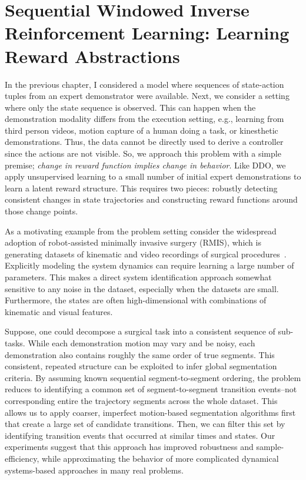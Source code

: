 \chapter{Sequential Windowed Inverse Reinforcement Learning: Learning Reward Abstractions}
In the previous chapter, I considered a model where sequences of state-action tuples from an expert demonstrator were available.
Next, we consider a setting where only the state sequence is observed.
This can happen when the demonstration modality differs from the execution setting, e.g., learning from third person videos, motion capture of a human doing a task, or kinesthetic demonstrations. 
Thus, the data cannot be directly used to derive a controller since the actions are not visible.
So, we approach this problem with a simple premise;  \emph{change in reward function implies change in behavior}.
Like DDO, we apply unsupervised learning to a small number of initial expert demonstrations to learn a latent reward structure. This requires two pieces: robustly detecting consistent changes in state trajectories and constructing reward functions around those change points.

As a motivating example from the problem setting consider the widespread adoption of robot-assisted minimally invasive surgery (RMIS), which is generating datasets of kinematic and video recordings of surgical procedures~\cite{gao2014jigsaws}.
Explicitly modeling the system dynamics can require learning a large number of parameters.
This makes a direct system identification approach somewhat sensitive to any noise in the dataset, especially when the datasets are small. 
Furthermore, the states are often high-dimensional with combinations of kinematic and visual features.

Suppose, one could decompose a surgical task into a consistent sequence of sub-tasks.
While each demonstration motion may vary and be noisy, each demonstration also contains roughly the same order of true segments.
This consistent, repeated structure can be exploited to infer global segmentation criteria.
By assuming known sequential segment-to-segment ordering, the problem reduces to identifying a common set of segment-to-segment transition events--not corresponding entire the trajectory segments across the whole dataset.
This allows us to apply coarser, imperfect motion-based segmentation algorithms first that create a large set of candidate transitions.
Then, we can filter this set by identifying transition events that occurred at similar times and states.
Our experiments suggest that this approach has improved robustness and sample-efficiency, while approximating the behavior of more complicated dynamical systems-based approaches in many real problems.


